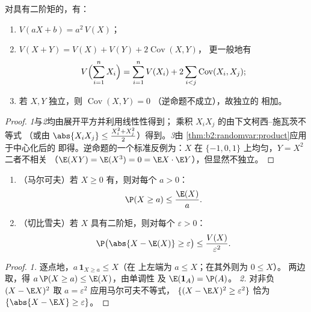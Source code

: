 \begin{theorem}[方差的常用性质]\label{thm:b2:randomvar:variancerules}
对具有二阶矩的，有：
\begin{enumerate}
\item $V(aX + b) = a^2\,V(X)$；
\item $V(X + Y) = V(X) + V(Y) + 2\operatorname{Cov}(X, Y)$，
更一般地有
\[
V\Bigl(\sum_{i=1}^n X_i\Bigr)
= \sum_{i=1}^n V(X_i)
+ 2\sum_{i < j}\operatorname{Cov}(X_i, X_j) ;
\]
\item 若 $X, Y$ 独立，则 $\operatorname{Cov}(X, Y) = 0$
（逆命题不成立），故独立的
相加。
\end{enumerate}
\end{theorem}

\begin{proof}
\emph{1}与\emph{2}均由展开平方并利用线性性得到；
乘积 $X_iX_j$ 的由下文柯西--施瓦茨不等式
（或由 $\abs{X_iX_j} \leq \frac{X_i^2 + X_j^2}{2}$）得到。\emph{3}由
\cref{thm:b2:randomvar:product}应用于中心化后的
即得。逆命题的一个标准反例为：$X$ 在
$\{-1, 0, 1\}$ 上均匀，$Y = X^2$ 二者不相关
（$\E(XY) = \E(X^3) = 0 = \E X \cdot \E Y$），但显然不独立。
\end{proof}

\begin{theorem}\label{thm:b2:randomvar:markov}
\leavevmode
\begin{enumerate}
\item （马尔可夫）若 $X \geq 0$ 有，则对每个 $a
> 0$：
\[
\P(X \geq a) \leq \frac{\E(X)}{a} .
\]
\item （切比雪夫）若 $X$ 具有二阶矩，则对每个
$\varepsilon > 0$：
\[
\P\bigl(\abs{X - \E(X)} \geq \varepsilon\bigr)
\leq \frac{V(X)}{\varepsilon^2} .
\]
\end{enumerate}
\end{theorem}

\begin{proof}
\emph{1.} 逐点地，$a\,\mathbf{1}_{X \geq a} \leq X$（在
上左端为 $a \leq X$；在其外则为 $0 \leq X$）。
两边取，得 $a\,\P(X \geq a) \leq \E(X)$，由单调性
及 $\E(\mathbf{1}_A) = \P(A)$。
\emph{2.} 对非负 $(X - \E
X)^2$ 取 $a = \varepsilon^2$ 应用马尔可夫不等式， $\{(X - \E X)^2
\geq \varepsilon^2\}$ 恰为 $\{\abs{X - \E X} \geq
\varepsilon\}$。
\end{proof}

